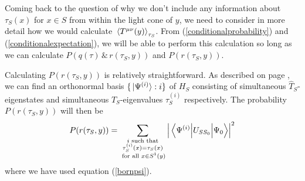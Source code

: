  Coming back to the question of why we don't include any information about $\tau_S(x)$ for $x\in S$ from within the light cone of $y$, we need to consider in more detail how we would calculate $\ev*{T^{\mu\nu}(y)}_{\tau_S}$. From (\ref{conditionalprobability}) and (\ref{conditionalexpectation}), we will be able to perform this calculation so long as we can calculate $P(q(\tau) \, \&\,  r(\tau_S,y))$ and $P(r(\tau_S,y))$. 
 
 Calculating $P(r(\tau_S,y))$ is relatively straightforward. As described on page \pageref{simultaneous}, we can find an orthonormal basis $\{\ket*{\Psi^{(i)}}:i\}$ of $H_S$ consisting of simultaneous $\hat{T}_S$-eigenstates and simultaneous $\hat{T}_S$-eigenvalues $\tau^{(i)}_S$ respectively. The probability $P(r(\tau_S,y))$ will then be 
 $$P(r(\tau_S,y))=\sum_{\substack{i \text{ such that} \\ \tau_S^{(i)}(x)=\tau_S(x)\\ \text{ for all }x\in S^1(y)}}\abs{\mel{\Psi^{(i)}}{U_{SS_0}}{\Psi_0}}^2$$
 where we have used equation (\ref{bornpsi}).

